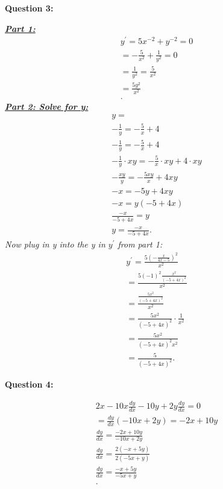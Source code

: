\documentclass{report}
\begin{document}
    \bigbreak \noindent \bigbreak \noindent 
    \begin{Large}
        \textbf{Question 3:}
    \end{Large}
    \bigbreak \noindent 
    \bigbreak \noindent 
    \textbf{\textit{\underline{Part 1:}}}
    \begin{align*}
      y^{\prime} = 5x^{-2} + y^{-2} = 0 \\
      = -\frac{5}{x^{2}} + \frac{1}{y^{2}} = 0  \\
      = \frac{1}{y^{2}} = \frac{5}{x^{2}}  \\
      =  \frac{5y^{2}}{x^{2}}  \\
    .\end{align*}
    \textbf{\textit{\underline{Part 2: Solve for y:}}}
    \begin{align*}
      y= \\
      -\frac{1}{y} = -\frac{5}{x}  +4 \\
      -\frac{1}{y} = -\frac{5}{x} + 4 \\ 
      -\frac{1}{y} \cdot xy = -\frac{5}{x} \cdot xy +4 \cdot xy \\
        -\frac{xy}{y} = -\frac{5xy}{x} + 4xy \\
        -x = -5y+4xy \\
        -x = y(-5+4x) \\
        \frac{-x}{-5+4x} = y \\
        y = \frac{-x}{-5+4x}
   .\end{align*}
   \bigbreak \noindent 
   \textit{Now plug in y into the y in $y^{\prime}$ from part 1:}
   \begin{align*}
     y^{\prime} = \frac{5(-\frac{x}{4x-5})^{2}}{x^{2}} \\
     = \frac{5(-1)^{2}\frac{x^{2}}{(-5+4x)^{2}}}{x^{2}} \\
     = \frac{\frac{5x^{2}}{(-5+4x)^{2}}}{x^{2}} \\
     = \frac{5x^{2}}{(-5+4x)^{2}} \cdot \frac{1}{x^{2}} \\
     = \frac{5x^{2}}{(-5+4x)^{2}x^{2}} \\
     = \frac{5}{(-5+4x)^{2}}
   .\end{align*}


    \bigbreak \noindent \bigbreak \noindent 
    \begin{Large}
        \textbf{Question 4:}
    \end{Large}
    \bigbreak \noindent 
    \bigbreak \noindent 
    \begin{align*}
      2x-10x \frac{dy}{dx}-10y+2y \frac{dy}{dx} = 0 \\
      = \frac{dy}{dx}(-10x+2y) = -2x + 10y \\
      \frac{dy}{dx} = \frac{-2x+10y}{-10x+2y} \\
      \frac{dy}{dx} = \frac{2(-x+5y)}{2(-5x+y)} \\
      \frac{dy}{dx} = \frac{-x+5y}{-5x+y} \\
    .\end{align*}
\end{document}
